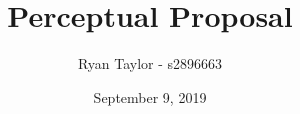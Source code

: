 \documentclass[a4paper, 12pt]{book}
\begin{document}
\title{\Large{\textbf{Perceptual Proposal}}}
\author{Ryan Taylor - s2896663}
\date{September 9, 2019}

\maketitle

\blindtext[5]
\end{document}

